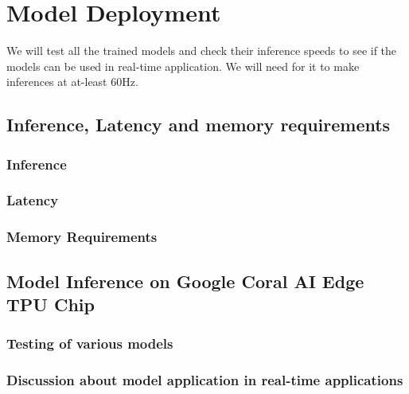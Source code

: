 \chapter{Model Deployment} \label{chapter_five}


We will test all the trained models and check their inference speeds to see if the models can be used in real-time application. We will need for it to make inferences at at-least 60Hz.

\section{Inference, Latency and memory requirements}

\subsection{Inference}
\subsection{Latency}
\subsection{Memory Requirements}

\section{Model Inference on Google Coral AI Edge TPU Chip}

\subsection{Testing of various models}

\subsection{Discussion about model application in real-time applications}